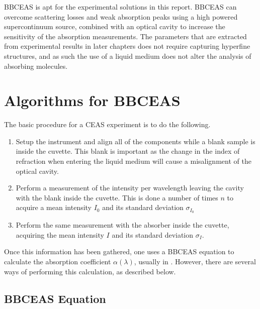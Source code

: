 \ac{BBCEAS} is apt for the experimental solutions in this report. \ac{BBCEAS}
can overcome scattering losses and weak absorption peaks using a high powered
supercontinuum source, combined with an optical cavity to increase the
sensitivity of the absorption measurements. The parameters that are extracted
from experimental results in later chapters does not require capturing
hyperfine structures, and as such the use of a liquid medium does not alter
the analysis of absorbing molecules.



\section{Algorithms for BBCEAS}


The basic procedure for a CEAS experiment is to do the following.

\begin{enumerate}
  \item Setup the instrument and align all of the components while a blank
        sample is inside the cuvette. This blank is important as the change in
        the index of refraction when entering the liquid medium will cause a
        misalignment of the optical cavity.
  \item Perform a measurement of the intensity per wavelength leaving the
        cavity with the blank inside the cuvette. This is done a number of
        times $n$ to acquire a mean intensity $I_0$ and its standard deviation
        $\sigma_{I_0}$
  \item Perform the same measurement with the absorber inside the cuvette,
        acquiring the mean intensity $I$ and its standard deviation
        $\sigma_{I}$.
\end{enumerate}

Once this information has been gathered, one uses a \ac{BBCEAS} equation to
calculate the absorption coefficient $\alpha(\lambda)$, usually in \icm.
However, there are several ways of performing this calculation, as described
below.



\subsection{BBCEAS Equation}\label{subsec:bbceas_eq}

